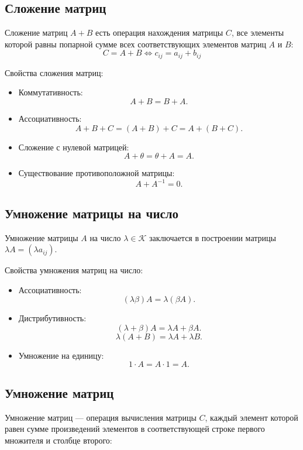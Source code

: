 \documentclass[a5paper, 11pt]{extbook}
\theoremstyle{definition}
\theoremstyle{definition}
\theoremstyle{definition}
\begin{document}
\subsection{Сложение матриц}
\label{sec:org930f363}
Сложение матриц \(A + B\) есть операция нахождения матрицы \(C\), все элементы которой равны попарной сумме всех соответствующих элементов матриц \(A\) и \(B\):
\begin{equation*}
    C = A + B \iff c_{ij} = a_{ij} + b_{ij}
\end{equation*}

Свойства сложения матриц:
\begin{itemize}
    \item Коммутативность:
          \[
              A + B = B + A.
          \]
    \item Ассоциативность:
          \[
              A + B + C = (A + B) + C = A + (B + C).
          \]
    \item Сложение с нулевой матрицей:
          \[
              A + \theta = \theta + A = A.
          \]
    \item Существование противоположной матрицы:
          \[
              A + A^{-1} = 0.
          \]
\end{itemize}

\subsection{Умножение матрицы на число}
\label{sec:org006ca40}
Умножение матрицы \(A\) на число \(\lambda \in \mathcal{K}\) заключается в построении матрицы \(\lambda A = (\lambda a_{ij})\).

Свойства умножения матриц на число:
\begin{itemize}
    \item Ассоциативность:
          \[
              (\lambda \beta) A = \lambda (\beta A).
          \]
    \item Дистрибутивность:
          \[
              (\lambda + \beta) A = \lambda A + \beta A.
          \]
          \[
              \lambda (A + B) = \lambda A + \lambda B.
          \]
    \item Умножение на единицу:
          \[
              1 \cdot A = A \cdot 1 = A.
          \]
\end{itemize}

\subsection{Умножение матриц}
\label{sec:org3cd53f8}
Умножение матриц — операция вычисления матрицы \(C\), каждый элемент которой равен сумме произведений элементов в соответствующей строке первого множителя и столбце второго:
\end{document}

